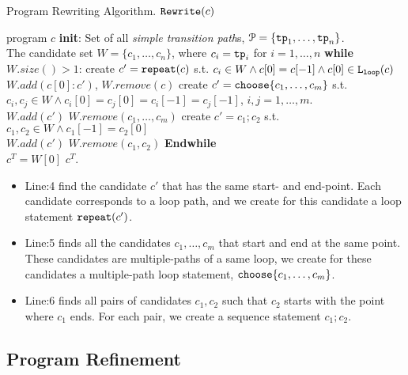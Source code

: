 \begin{algorithm}
 \caption{Program Rewriting Algorithm. $\mathtt{Rewrite}(c)$}
 \label{alg:alg-refine_rewrite}
 \begin{algorithmic}[1]
 \REQUIRE program $c$
 \STATE \textbf{init}: 
 Set of all \emph{simple transition path}s, 
 $\mathcal{P} = \{ \mathtt{tp}_1, \ldots, \mathtt{tp}_n \}$.
 \\
 The candidate set $W = \{c_1, \ldots, c_n\}$, where $c_i = \mathtt{tp}_i$ for $i = 1, \ldots, n$
 \STATE \textbf{while} $W.size()> 1$:
 \STATE
 \quad create $c' = \mathtt{repeat}(c)$ s.t. $c_i \in W \land c[0] = c[-1] \land c[0] \in \mathtt{L}_{\mathtt{loop}}(c)$
 \\ \quad $W.add(c[0]: c')$, \qquad $W.remove(c)$
 \STATE \quad create $c' = \rpchoose{c_1, \ldots, c_m}$ 
 s.t. $c_i, c_j \in W \land c_i[0] = c_j[0] = c_i[-1] = c_j[-1]$, $i, j = 1, \ldots, m$.
 \\ \quad $W.add(c')$ \qquad $W.remove(c_1, \ldots, c_m)$
 \STATE \quad create $c' = c_1; c_2$ s.t. $c_1, c_2 \in W \land c_1[-1] = c_2[0]$
 \\
 \quad $W.add(c')$ \qquad $W.remove(c_1, c_2)$
 \STATE \textbf{Endwhile}
 \\ $c^T = W[0]$
 \RETURN $c^T$.
\end{algorithmic}
\end{algorithm}
%
\begin{itemize}
\item
Line:4 find the candidate $c'$ that has the same start- and end-point.
Each candidate corresponds to a loop path, and we create for this candidate a loop statement
$\mathtt{repeat}(c')$.

\item
 Line:5 
 finds all the candidates $c_1, \ldots, c_m$ that start and end at the same point.
 These candidates are multiple-paths of a same loop, 
 we create for these candidates a multiple-path loop statement,  $\rpchoose{c_1, \ldots, c_m}$.
\item
Line:6 finds all pairs of candidates $c_1, c_2$ such that  $c_2$ starts with the point where $c_1$ ends.
For each pair, we create a sequence statement
 $c_1; c_2$.
\end{itemize}

\subsection{Program Refinement}

